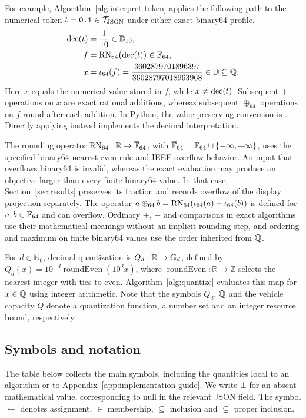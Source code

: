 For example, Algorithm~\ref{alg:interpret-token} applies the following path to the numerical token $t=\texttt{0.1}\in\mathcal{T}_{\mathrm{JSON}}$ under either exact binary64 profile.
\begin{align}
\operatorname{dec}(t)&=\frac{1}{10}\in\mathbb{D}_{10},\\
f&=\operatorname{RN}_{64}\bigl(\operatorname{dec}(t)\bigr)\in\mathbb{F}_{64},\\
x&=\iota_{64}(f)=\frac{3602879701896397}{36028797018963968}\in\mathbb{D}\subseteq\mathbb{Q}.
\end{align}
Here $x$ equals the numerical value stored in $f$, while $x\ne\operatorname{dec}(t)$. Subsequent $+$ operations on $x$ are exact rational additions, whereas subsequent $\oplus_{64}$ operations on $f$ round after each addition. In Python, the value-preserving conversion is . Directly applying  instead implements the decimal interpretation.

The rounding operator $\operatorname{RN}_{64}:\mathbb{R}\to\overline{\mathbb{F}}_{64}$, with $\overline{\mathbb{F}}_{64}=\mathbb{F}_{64}\cup\{-\infty,+\infty\}$, uses the specified binary64 nearest-even rule and IEEE overflow behavior. An input that overflows binary64 is invalid, whereas the exact evaluation may produce an objective larger than every finite binary64 value. In that case, Section~\ref{sec:results} preserves its fraction and records overflow of the display projection separately. The operator $a\oplus_{64}b=\operatorname{RN}_{64}(\iota_{64}(a)+\iota_{64}(b))$ is defined for $a,b\in\mathbb{F}_{64}$ and can overflow. Ordinary $+$, $-$ and comparisons in exact algorithms use their mathematical meanings without an implicit rounding step, and ordering and maximum on finite binary64 values use the order inherited from $\mathbb{Q}$.

For $d\in\mathbb{N}_0$, decimal quantization is $Q_d:\mathbb{R}\to\mathbb{G}_{d}$, defined by $Q_d(x)=10^{-d}\operatorname{roundEven}(10^d x)$, where $\operatorname{roundEven}:\mathbb{R}\to\mathbb{Z}$ selects the nearest integer with ties to even. Algorithm~\ref{alg:quantize} evaluates this map for $x\in\mathbb{Q}$ using integer arithmetic. Note that the symbols $Q_d$, $\mathbb{Q}$ and the vehicle capacity $Q$ denote a quantization function, a number set and an integer resource bound, respectively.

\subsection{Symbols and notation}
The table below collects the main symbols, including the quantities local to an algorithm or to Appendix~\ref{app:implementation-guide}. We write $\bot$ for an absent mathematical value, corresponding to null in the relevant JSON field. The symbol $\gets$ denotes assignment, $\in$ membership, $\subseteq$ inclusion and $\subsetneq$ proper inclusion.

